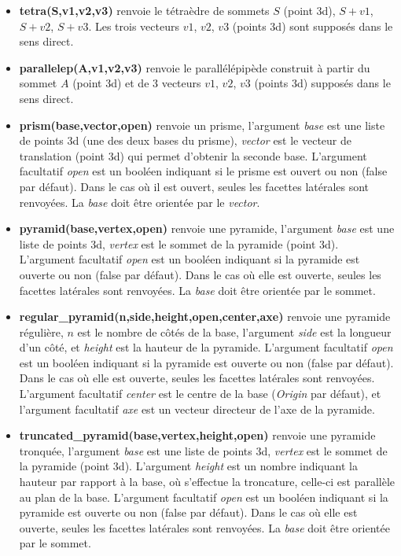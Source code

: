 \begin{itemize}
    \item \textbf{tetra(S,v1,v2,v3)} renvoie le tétraèdre de sommets $S$ (point 3d), $S+v1$, $S+v2$, $S+v3$. Les trois vecteurs $v1$, $v2$, $v3$ (points 3d) sont supposés dans le sens direct.
    
    \item \textbf{parallelep(A,v1,v2,v3)} renvoie le parallélépipède construit à partir du sommet $A$ (point 3d) et de 3 vecteurs $v1$, $v2$, $v3$ (points 3d) supposés dans le sens direct.
    
    \item \textbf{prism(base,vector,open)} renvoie un prisme, l'argument \emph{base} est une liste de points 3d (une des deux bases du prisme), \emph{vector} est le vecteur de translation (point 3d) qui permet d'obtenir la seconde base. L'argument facultatif \emph{open} est un booléen indiquant si le prisme est ouvert ou non (false par défaut). Dans le cas où il est ouvert, seules les facettes latérales sont renvoyées. La \emph{base} doit être orientée par le \emph{vector}.
    
    \item \textbf{pyramid(base,vertex,open)} renvoie une pyramide, l'argument \emph{base} est une liste de points 3d, \emph{vertex} est le sommet de la pyramide (point 3d). L'argument facultatif \emph{open} est un booléen indiquant si la pyramide est ouverte ou non (false par défaut). Dans le cas où elle est ouverte, seules les facettes latérales sont renvoyées. La \emph{base} doit être orientée par le sommet.
    
    \item \textbf{regular\_pyramid(n,side,height,open,center,axe)} renvoie une pyramide régulière, $n$ est le nombre de côtés de la base, l'argument \emph{side} est la longueur d'un côté, et \emph{height} est la hauteur de la pyramide. L'argument facultatif \emph{open} est un booléen indiquant si la pyramide est ouverte ou non (false par défaut). Dans le cas où elle est ouverte, seules les facettes latérales sont renvoyées. L'argument facultatif \emph{center} est le centre de la base (\emph{Origin} par défaut), et l'argument facultatif \emph{axe} est un vecteur directeur de l'axe de la pyramide.
    
    \item \textbf{truncated\_pyramid(base,vertex,height,open)} renvoie une pyramide tronquée, l'argument \emph{base} est une liste de points 3d, \emph{vertex} est le sommet de la pyramide (point 3d). L'argument \emph{height} est un nombre indiquant la hauteur par rapport à la base, où s'effectue la troncature, celle-ci est parallèle au plan de la base. L'argument facultatif \emph{open} est un booléen indiquant si la pyramide est ouverte ou non (false par défaut). Dans le cas où elle est ouverte, seules les facettes latérales sont renvoyées. La \emph{base} doit être orientée par le sommet.
    

\end{itemize}
